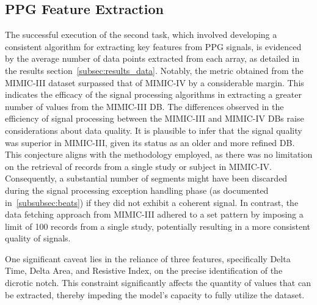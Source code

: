 \subsection{PPG Feature Extraction}
\label{subsec:ppg-feature-extraction}

The successful execution of the second task, which involved developing a consistent algorithm for extracting key features from PPG signals,
is evidenced by the average number of data points extracted from each array, as detailed in the results section~\ref{subsec:results_data}.
Notably, the metric obtained from the MIMIC-III dataset surpassed that of MIMIC-IV by a considerable margin.
This indicates the efficacy of the signal processing algorithms in extracting a greater number of values from the MIMIC-III DB.
The differences observed in the efficiency of signal processing between the MIMIC-III and MIMIC-IV DBs raise considerations about data quality.
It is plausible to infer that the signal quality was superior in MIMIC-III, given its status as an older and more refined DB\@.
This conjecture aligns with the methodology employed, as there was no limitation on the retrieval of records from a single study or subject in MIMIC-IV\@.
Consequently, a substantial number of segments might have been discarded during the signal processing exception handling phase (as documented in~\ref{subsubsec:beats}) if they did not exhibit a coherent signal.
In contrast, the data fetching approach from MIMIC-III adhered to a set pattern by imposing a limit of 100 records from a single study, potentially resulting in a more consistent quality of signals.

One significant caveat lies in the reliance of three features, specifically Delta Time, Delta Area, and Resistive Index, on the precise identification of the dicrotic notch.
This constraint significantly affects the quantity of values that can be extracted, thereby impeding the model's capacity to fully utilize the dataset.


